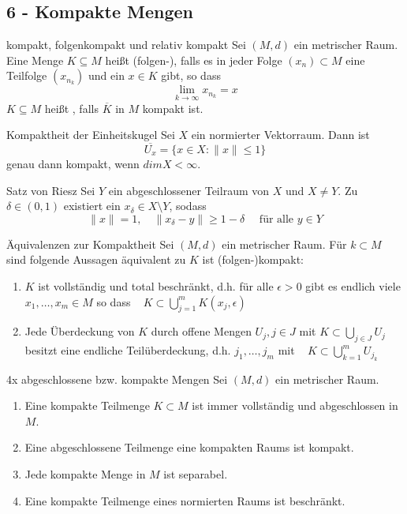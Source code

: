 \subsection*{6 - Kompakte Mengen}

	\begin{karte}{kompakt, folgenkompakt und relativ kompakt}
		Sei $(M, d)$ ein metrischer Raum. Eine Menge $K \subseteq M$ hei{\ss}t (folgen-), falls es in jeder Folge $(x_{n}) \subset M$ eine Teilfolge $(x_{n_{k}})$ und ein $x \in K$ gibt, so dass 
		\[ \lim_{k \rightarrow \infty} x_{n_{k}} = x \]
		$K \subseteq M$ hei{\ss}t , falls $\overline{K}$ in $M$ kompakt ist.	
	\end{karte}
	
	\begin{karte}{Kompaktheit der Einheitskugel}
		Sei $X$ ein normierter Vektorraum. Dann ist
		\[ \overline{U_{x}} = \{ x \in X: \| x \| \leq 1 \} \]
		genau dann kompakt, wenn $dim X < \infty$.
	\end{karte}
	
	\begin{karte}{Satz von Riesz}
		Sei $Y$ ein abgeschlossener Teilraum von $X$ und $X \neq Y$. Zu $\delta \in (0, 1)$ existiert ein $x_{\delta} \in X \setminus Y$, sodass
		\[ \| x \| = 1, \quad \| x_{\delta} - y\| \geq 1 - \delta \quad \text{ für alle } y \in Y \]
	\end{karte}
	
	\begin{karte}{Äquivalenzen zur Kompaktheit}
		Sei $(M, d)$ ein metrischer Raum. Für $k \subset M$ sind folgende Aussagen äquivalent zu $K$ ist (folgen-)kompakt:
		\begin{enumerate}[label=\alph*\upshape)]
			\item $K$ ist vollständig und total beschränkt, d.h. für alle $\epsilon > 0$ gibt es endlich viele $x_{1}, \dotsc, x_{m} \in M$ so dass ~ $K \subset \bigcup_{j = 1}^{m} K(x_{j}, \epsilon)$
			\item Jede Überdeckung von $K$ durch offene Mengen $U_{j}, j \in J$ mit $K \subset \bigcup_{j \in J} U_{j}$ besitzt eine endliche Teilüberdeckung, d.h. $j_{1}, \dotsc, j_{m}$ mit ~ $K \subset \bigcup_{k = 1}^{m} U_{j_{k}}$
		\end{enumerate}	
	\end{karte}
	
	\begin{karte}{4x abgeschlossene bzw. kompakte Mengen}
		Sei $(M, d)$ ein metrischer Raum.
	\begin{enumerate}[label=\alph*\upshape)]
		\item Eine kompakte Teilmenge $K \subset M$ ist immer vollständig und abgeschlossen in $M$.
		\item Eine abgeschlossene Teilmenge eine kompakten Raums ist kompakt.
		\item Jede kompakte Menge in $M$ ist separabel.
		\item Eine kompakte Teilmenge eines normierten Raums ist beschränkt.
	\end{enumerate}
	\end{karte}
		
